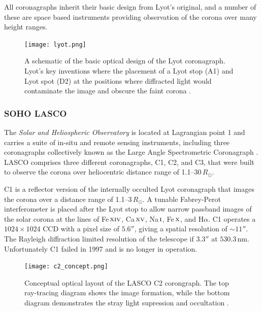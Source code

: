 All coronagraphs inherit their basic design from Lyot's original, and a number of these are space based instruments providing observation of the corona over many height ranges.

\begin{figure}[!t]
\begin{center}
\texttt{[image: lyot.png]}
\caption[The Lyot coronagraph]{A schematic of the basic optical design of the Lyot coronagraph. Lyot's key inventions where the placement of a Lyot stop (A1) and Lyot spot (D2) at the positions where diffracted light would contaminate the image and obscure the faint corona \citep{bru95}.}
\label{fig:lyot}
\end{center}
\end{figure}

\subsubsection{SOHO LASCO}\label{sec:23}

The \emph{Solar and Heliospheric Observatory} \citep[\emph{SOHO};][]{dom95} is located at Lagrangian point 1 and carries a suite of in-situ and remote sensing instruments, including three coronagraphs collectively known as the Large Angle Spectrometric Coronagraph \citep[LASCO;][]{bru95}. LASCO comprises three different coronagraphs, C1, C2, and C3, that were built to observe the corona over heliocentric distance range of 1.1--30\,$R_{\odot}$. 

C1 is a reflector version of the internally occulted Lyot coronagraph that images the corona over a distance range of 1.1--3\,$R_{\odot}$. A tunable Fabrey-Perot interferometer is placed after the Lyot stop to allow narrow passband images of the solar corona at the lines of Fe\,$\textsc{xiv}$, Ca\,$\textsc{xv}$, Na\,$\textsc{i}$, Fe\,$\textsc{x}$, and H$\alpha$. 
C1 operates a $1024\times1024$ CCD with a pixel size of $5.6''$, giving a spatial resolution of $\sim11''$. The Rayleigh diffraction limited resolution of the telescope if $3.3''$ at $530.3$\,nm. Unfortunately C1 failed in 1997 and is no longer in operation. 
\begin{figure}[!t]
\begin{center}
\texttt{[image: c2\_concept.png]}
\caption[The LASCO C2 coronagraph optics]{Conceptual optical layout of the LASCO C2 corongraph. The top ray-tracing diagram shows the image formation, while the bottom diagram demonstrates the stray light supression and occultation \citep{bru95}.}
\label{fig:c2_concept}
\end{center}
\end{figure}

